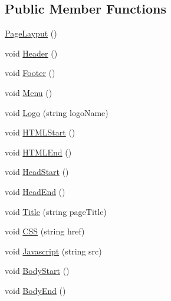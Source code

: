 \subsection*{Public Member Functions}
\begin{DoxyCompactItemize}
\item 
\hyperlink{classPageLayout_af085725aaa6c01595565797c9f205173_af085725aaa6c01595565797c9f205173}{Page\-Layput} ()
\item 
void \hyperlink{classPageLayout_a7726061f0653245f644a05807fa92472_a7726061f0653245f644a05807fa92472}{Header} ()
\item 
void \hyperlink{classPageLayout_a68aa868a8868b12964f161838b5f814c_a68aa868a8868b12964f161838b5f814c}{Footer} ()
\item 
void \hyperlink{classPageLayout_a49af1dca286bbee9432192a7b3c00332_a49af1dca286bbee9432192a7b3c00332}{Menu} ()
\item 
void \hyperlink{classPageLayout_ae60235c6af48e3ebbc6343d02456da0c_ae60235c6af48e3ebbc6343d02456da0c}{Logo} (string logo\-Name)
\item 
void \hyperlink{classHTMLTags_a567551cd701d2836d4240b2917b5e13f_a567551cd701d2836d4240b2917b5e13f}{H\-T\-M\-L\-Start} ()
\item 
void \hyperlink{classHTMLTags_a6553c3d01ee194a1d157e6341333dee3_a6553c3d01ee194a1d157e6341333dee3}{H\-T\-M\-L\-End} ()
\item 
void \hyperlink{classHTMLTags_af2b01cc08884af52e0b291d07035062e_af2b01cc08884af52e0b291d07035062e}{Head\-Start} ()
\item 
void \hyperlink{classHTMLTags_afdc779e46fac16cc79e4f0e87f621254_afdc779e46fac16cc79e4f0e87f621254}{Head\-End} ()
\item 
void \hyperlink{classHTMLTags_a5128d6f1c6be5ac1689047fc9d0d159f_a5128d6f1c6be5ac1689047fc9d0d159f}{Title} (string page\-Title)
\item 
void \hyperlink{classHTMLTags_a4e9e18580cc7f2b82c82e4f81e39be50_a4e9e18580cc7f2b82c82e4f81e39be50}{C\-S\-S} (string href)
\item 
void \hyperlink{classHTMLTags_aea041d720f12a210615c95350774e6aa_aea041d720f12a210615c95350774e6aa}{Javascript} (string src)
\item 
void \hyperlink{classHTMLTags_af1fb7b90b9ebb83177da18aba1ef86a9_af1fb7b90b9ebb83177da18aba1ef86a9}{Body\-Start} ()
\item 
void \hyperlink{classHTMLTags_a7cae36bd3a0e6f35e89494e5cda64971_a7cae36bd3a0e6f35e89494e5cda64971}{Body\-End} ()
\end{DoxyCompactItemize}
